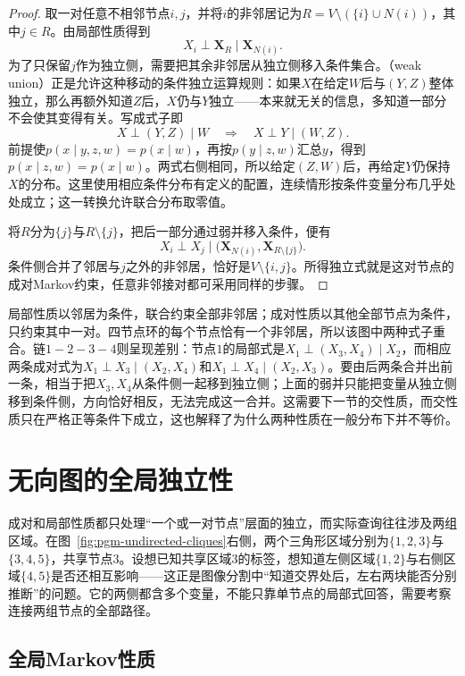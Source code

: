 \begin{proof}
取一对任意不相邻节点$i,j$，并将$i$的非邻居记为$R=V\setminus(\{i\}\cup N(i))$，其中$j\in R$。由局部性质得到
\[
  X_i\perp\bm{X}_R\mid\bm{X}_{N(i)}.
\]
为了只保留$j$作为独立侧，需要把其余非邻居从独立侧移入条件集合。（weak union）正是允许这种移动的条件独立运算规则：如果$X$在给定$W$后与$(Y,Z)$整体独立，那么再额外知道$Z$后，$X$仍与$Y$独立——本来就无关的信息，多知道一部分不会使其变得有关。写成式子即
\[
  X\perp(Y,Z)\mid W
  \quad\Longrightarrow\quad
  X\perp Y\mid(W,Z).
\]
前提使$p(x\mid y,z,w)=p(x\mid w)$，再按$p(y\mid z,w)$汇总$y$，得到$p(x\mid z,w)=p(x\mid w)$。两式右侧相同，所以给定$(Z,W)$后，再给定$Y$仍保持$X$的分布。这里使用相应条件分布有定义的配置，连续情形按条件变量分布几乎处处成立；这一转换允许联合分布取零值。

将$R$分为$\{j\}$与$R\setminus\{j\}$，把后一部分通过弱并移入条件，便有
\[
  X_i\perp X_j
  \mid\bigl(\bm{X}_{N(i)},\bm{X}_{R\setminus\{j\}}\bigr).
\]
条件侧合并了邻居与$j$之外的非邻居，恰好是$V\setminus\{i,j\}$。所得独立式就是这对节点的成对Markov约束，任意非邻接对都可采用同样的步骤。
\end{proof}

局部性质以邻居为条件，联合约束全部非邻居；成对性质以其他全部节点为条件，只约束其中一对。四节点环的每个节点恰有一个非邻居，所以该图中两种式子重合。链$1-2-3-4$则呈现差别：节点$1$的局部式是$X_1\perp(X_3,X_4)\mid X_2$，而相应两条成对式为$X_1\perp X_3\mid(X_2,X_4)$和$X_1\perp X_4\mid(X_2,X_3)$。要由后两条合并出前一条，相当于把$X_3,X_4$从条件侧一起移到独立侧；上面的弱并只能把变量从独立侧移到条件侧，方向恰好相反，无法完成这一合并。这需要下一节的交性质，而交性质只在严格正等条件下成立，这也解释了为什么两种性质在一般分布下并不等价。

\section{无向图的全局独立性}
\label{sec:pgm-undirected-global-independence}

成对和局部性质都只处理“一个或一对节点”层面的独立，而实际查询往往涉及两组区域。在图~\ref{fig:pgm-undirected-cliques}右侧，两个三角形区域分别为$\{1,2,3\}$与$\{3,4,5\}$，共享节点$3$。设想已知共享区域$3$的标签，想知道左侧区域$\{1,2\}$与右侧区域$\{4,5\}$是否还相互影响——这正是图像分割中“知道交界处后，左右两块能否分别推断”的问题。它的两侧都含多个变量，不能只靠单节点的局部式回答，需要考察连接两组节点的全部路径。

\subsection{全局Markov性质}
\label{sec:pgm-undirected-global}


